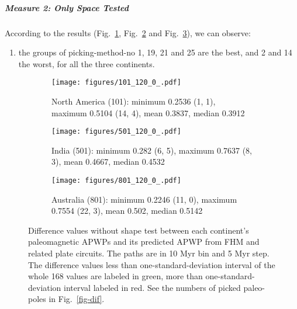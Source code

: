 \subparagraph{Measure 2: Only Space Tested}

According to the results (Fig.~\ref{fig-nant-dif}, Fig.~\ref{fig-indnt-dif} and
Fig.~\ref{fig-aunt-dif}), we can observe:
%
\begin{enumerate}
  \item the groups of picking-method-no 1, 19, 21 and 25 are the best, and 2
        and 14 the worst, for all the three continents.
\end{enumerate}

\begin{figure*}
	\centering
	\begin{subfigure}{1.01\textwidth}
		\texttt{[image: figures/101\_120\_0\_.pdf]}
		\caption{North America (101): minimum 0.2536 (1, 1), maximum 0.5104 (14, 4), mean 0.3837, median 0.3912}\label{fig-nant-dif}
	\end{subfigure}
	\vspace{.1em}
	\begin{subfigure}{1.01\textwidth}
		\texttt{[image: figures/501\_120\_0\_.pdf]}
		\caption{India (501): minimum 0.282 (6, 5), maximum 0.7637 (8, 3), mean 0.4667, median 0.4532}\label{fig-indnt-dif}
	\end{subfigure}
	\vspace{.1em}
	\begin{subfigure}{1.01\textwidth}
		\texttt{[image: figures/801\_120\_0\_.pdf]}
		\caption{Australia (801): minimum 0.2246 (11, 0), maximum 0.7554 (22, 3), mean 0.502, median 0.5142}\label{fig-aunt-dif}
	\end{subfigure}
	\caption[Differences without shape test of each plate's paleomagnetic APWPs
versus its FHM predicted APWP]{Difference values without shape test between each
continent's paleomagnetic APWPs and its predicted APWP from FHM and related
plate circuits. The paths are in 10 Myr bin and 5 Myr step. The difference
values less than one-standard-deviation interval of the whole 168 values are
labeled in green, more than one-standard-deviation interval labeled in red. See
the numbers of picked paleo-poles in Fig.~\ref{fig-dif}.}\label{fig-difnt}
\end{figure*}


